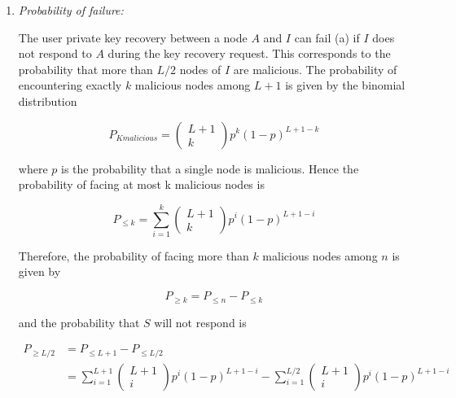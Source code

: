   \begin{enumerate}
    \item{\textit{Probability of failure:}}

    The user private key recovery between a node $A$ and $I$ can fail (a) if $I$ does
not respond to $A$ during the key recovery request. This corresponds to the
probability that more than $L/2$ nodes of $I$ are malicious. The probability of
encountering exactly $k$ malicious nodes among $L +1$ is given by the binomial
distribution

    \begin{equation}
      P_{K malicious} = \begin{pmatrix} L+1 \\ k\end{pmatrix} p^k (1-p)^{L+1-k}
    \end{equation}

    where $p$ is the probability that a single node is malicious. Hence the
probability of facing at most k malicious nodes is 

    \begin{equation}
      P_{\leq k} = \sum_{i=1}^{k} \begin{pmatrix} L+1 \\ k\end{pmatrix} p^i (1-p)^{L+1-i}
    \end{equation}

    Therefore, the probability of facing more than $k$ malicious nodes among
$n$ is given by

    \begin{equation}
      P_{\ge k} = P_{\leq n} - P_{\leq k}
    \end{equation}

    and the probability that $S$ will not respond is

    \begin{align}
      P_{\ge L/2} &= P_{\leq L+1} - P_{\leq L/2} \\
      &= \sum_{i=1}^{L+1} \begin{pmatrix} L+1 \\ i\end{pmatrix} p^i (1-p)^{L+1-i}
      - \sum_{i=1}^{L/2} \begin{pmatrix} L+1 \\ i\end{pmatrix} p^i (1-p)^{L+1-i}
    \end{align}



\end{enumerate}
